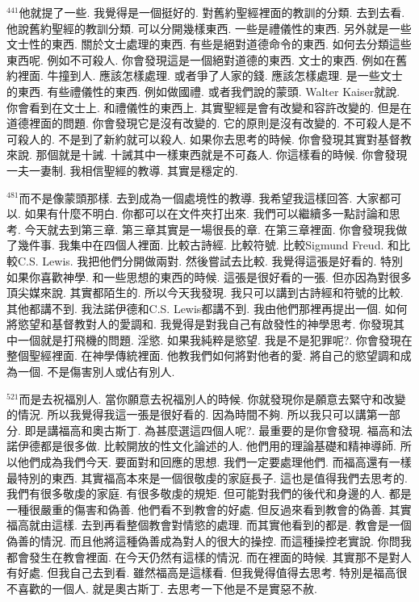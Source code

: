 \documentclass{book}
\begin{document}
$^{441}$他就提了一些.
我覺得是一個挺好的.
對舊約聖經裡面的教訓的分類.
去到去看.
他說舊約聖經的教訓分類.
可以分開幾樣東西.
一些是禮儀性的東西.
另外就是一些文士性的東西.
關於文士處理的東西.
有些是絕對道德命令的東西.
如何去分類這些東西呢.
例如不可殺人.
你會發現這是一個絕對道德的東西.
文士的東西.
例如在舊約裡面.
牛撞到人.
應該怎樣處理.
或者爭了人家的錢.
應該怎樣處理.
是一些文士的東西.
有些禮儀性的東西.
例如做國禮.
或者我們說的蒙頭.
Walter Kaiser就說.
你會看到在文士上.
和禮儀性的東西上.
其實聖經是會有改變和容許改變的.
但是在道德裡面的問題.
你會發現它是沒有改變的.
它的原則是沒有改變的.
不可殺人是不可殺人的.
不是到了新約就可以殺人.
如果你去思考的時候.
你會發現其實對基督教來說.
那個就是十誡.
十誡其中一樣東西就是不可姦人.
你這樣看的時候.
你會發現一夫一妻制.
我相信聖經的教導.
其實是穩定的.

$^{481}$而不是像蒙頭那樣.
去到成為一個處境性的教導.
我希望我這樣回答.
大家都可以.
如果有什麼不明白.
你都可以在文件夾打出來.
我們可以繼續多一點討論和思考.
今天就去到第三章.
第三章其實是一場很長的章.
在第三章裡面.
你會發現我做了幾件事.
我集中在四個人裡面.
比較古詩經.
比較符號.
比較Sigmund Freud.
和比較C.S. Lewis.
我把他們分開做兩對.
然後嘗試去比較.
我覺得這張是好看的.
特別如果你喜歡神學.
和一些思想的東西的時候.
這張是很好看的一張.
但亦因為對很多頂尖媒來說.
其實都陌生的.
所以今天我發現.
我只可以講到古詩經和符號的比較.
其他都講不到.
我法諾伊德和C.S. Lewis都講不到.
我由他們那裡再提出一個.
如何將慾望和基督教對人的愛調和.
我覺得是對我自己有啟發性的神學思考.
你發現其中一個就是打飛機的問題.
淫慾.
如果我純粹是慾望.
我是不是犯罪呢?.
你會發現在整個聖經裡面.
在神學傳統裡面.
他教我們如何將對他者的愛.
將自己的慾望調和成為一個.
不是傷害別人或佔有別人.

$^{521}$而是去祝福別人.
當你願意去祝福別人的時候.
你就發現你是願意去緊守和改變的情況.
所以我覺得我這一張是很好看的.
因為時間不夠.
所以我只可以講第一部分.
即是講福高和奧古斯丁.
為甚麼選這四個人呢?.
最重要的是你會發現.
福高和法諾伊德都是很多做.
比較開放的性文化論述的人.
他們用的理論基礎和精神導師.
所以他們成為我們今天.
要面對和回應的思想.
我們一定要處理他們.
而福高還有一樣最特別的東西.
其實福高本來是一個很敬虔的家庭長子.
這也是值得我們去思考的.
我們有很多敬虔的家庭.
有很多敬虔的規矩.
但可能對我們的後代和身邊的人.
都是一種很嚴重的傷害和偽善.
他們看不到教會的好處.
但反過來看到教會的偽善.
其實福高就由這樣.
去到再看整個教會對情慾的處理.
而其實他看到的都是.
教會是一個偽善的情況.
而且他將這種偽善成為對人的很大的操控.
而這種操控老實說.
你問我都會發生在教會裡面.
在今天仍然有這樣的情況.
而在裡面的時候.
其實那不是對人有好處.
但我自己去到看.
雖然福高是這樣看.
但我覺得值得去思考.
特別是福高很不喜歡的一個人.
就是奧古斯丁.
去思考一下他是不是實惡不赦.
\end{document}
